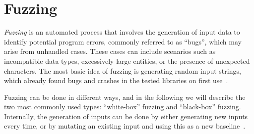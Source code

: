 \section{Fuzzing}
\label{sec:fuzzing}
\textit{Fuzzing} is an automated process that involves the generation of input data to identify potential program errors, commonly referred to as “bugs”, which may arise from unhandled cases. These cases can include scenarios such as incompatible data types, excessively large entities, or the presence of unexpected characters.
The most basic idea of fuzzing is generating random input strings, which already found bugs and crashes in the tested libraries on first use~\cite{miller_empirical_1990}.

Fuzzing can be done in different ways, and in the following we will describe the two most commonly used types: “white-box” fuzzing and “black-box” fuzzing.
Internally, the generation of inputs can be done by either generating new inputs every time, or by mutating an existing input and using this as a new baseline~\cite{van_sprundel_fuzzing_2005}.

